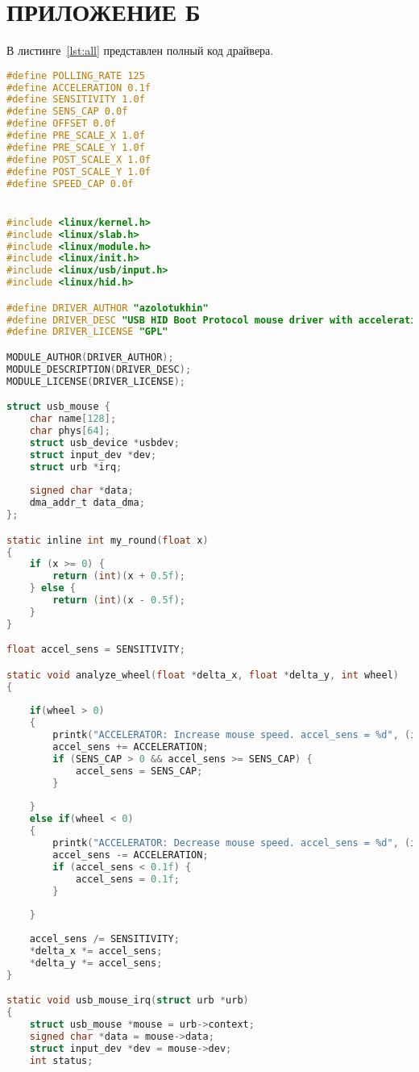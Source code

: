 \chapter*{ПРИЛОЖЕНИЕ Б}


В листинге~\ref{lst:all} представлен полный код драйвера.

\begin{lstlisting}[language=C, label=lst:all, caption=Полный код драйвера]
#define POLLING_RATE 125
#define ACCELERATION 0.1f
#define SENSITIVITY 1.0f
#define SENS_CAP 0.0f
#define OFFSET 0.0f
#define PRE_SCALE_X 1.0f
#define PRE_SCALE_Y 1.0f
#define POST_SCALE_X 1.0f
#define POST_SCALE_Y 1.0f
#define SPEED_CAP 0.0f


#include <linux/kernel.h>
#include <linux/slab.h>
#include <linux/module.h>
#include <linux/init.h>
#include <linux/usb/input.h>
#include <linux/hid.h>

#define DRIVER_AUTHOR "azolotukhin"
#define DRIVER_DESC "USB HID Boot Protocol mouse driver with acceleration"
#define DRIVER_LICENSE "GPL"

MODULE_AUTHOR(DRIVER_AUTHOR);
MODULE_DESCRIPTION(DRIVER_DESC);
MODULE_LICENSE(DRIVER_LICENSE);

struct usb_mouse {
	char name[128];
	char phys[64];
	struct usb_device *usbdev;
	struct input_dev *dev;
	struct urb *irq;
	
	signed char *data;
	dma_addr_t data_dma;
};

static inline int my_round(float x)
{
	if (x >= 0) {
		return (int)(x + 0.5f);
	} else {
		return (int)(x - 0.5f);
	}
}

float accel_sens = SENSITIVITY;

static void analyze_wheel(float *delta_x, float *delta_y, int wheel)
{
	
	if(wheel > 0)
	{
		printk("ACCELERATOR: Increase mouse speed. accel_sens = %d", (int)(accel_sens*10));
		accel_sens += ACCELERATION;
		if (SENS_CAP > 0 && accel_sens >= SENS_CAP) {
			accel_sens = SENS_CAP;
		}
		
	}
	else if(wheel < 0)
	{
		printk("ACCELERATOR: Decrease mouse speed. accel_sens = %d", (int)(accel_sens*10));
		accel_sens -= ACCELERATION;
		if (accel_sens < 0.1f) {
			accel_sens = 0.1f;
		}
		
	}
	
	accel_sens /= SENSITIVITY;
	*delta_x *= accel_sens;
	*delta_y *= accel_sens;
}

static void usb_mouse_irq(struct urb *urb)
{
	struct usb_mouse *mouse = urb->context;
	signed char *data = mouse->data;
	struct input_dev *dev = mouse->dev;
	int status;
	

\end{lstlisting}

